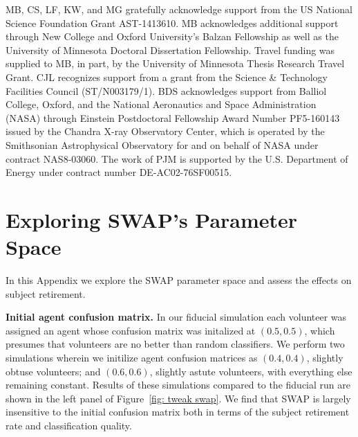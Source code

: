 \documentclass[twocolumn]{aastex6}
\begin{document}
MB, CS, LF, KW, and MG gratefully acknowledge support from the US National Science
Foundation Grant AST-1413610.  MB acknowledges additional support 
through New College and Oxford University's Balzan Fellowship as well as the University
of Minnesota Doctoral Dissertation Fellowship. Travel funding was supplied 
to MB, in part, by the University of Minnesota Thesis Research Travel Grant. CJL recognizes support from a grant from the Science \& Technology Facilities Council (ST/N003179/1). 
BDS acknowledges support from Balliol College, Oxford, and the National Aeronautics and Space Administration (NASA) through Einstein Postdoctoral Fellowship Award Number PF5-160143 issued by the Chandra X-ray Observatory Center, which is operated by the Smithsonian Astrophysical Observatory for and on behalf of NASA under contract NAS8-03060. The work of PJM is supported by the U.S. Department of Energy under contract number DE-AC02-76SF00515.





\appendix
\label{sec:Appendix}



\section{Exploring SWAP's Parameter Space} \label{sec: tweaking swap}

In this Appendix we explore the SWAP parameter space and assess the effects on subject retirement. 


\textbf{Initial agent confusion matrix.} 
In our fiducial simulation each volunteer was assigned an agent whose confusion matrix was
initalized at $(0.5, 0.5)$, which presumes that volunteers are no better than random classifiers.  
We perform two simulations wherein we initilize agent confusion matrices as $(0.4, 0.4)$, 
slightly obtuse volunteers; and $(0.6, 0.6)$, slightly astute volunteers, with everything else remaining constant.  
Results of these simulations compared to the fiducial run are shown in the left panel of
Figure~\ref{fig: tweak swap}. We find that SWAP is largely insensitive to the 
initial confusion matrix  both in terms of the subject retirement rate and classification quality.  
\end{document}
